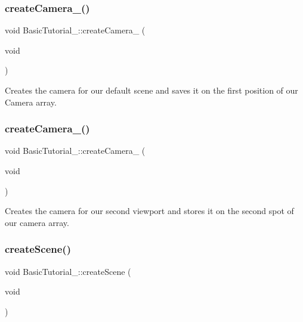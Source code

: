 \subsubsection{\texorpdfstring{create\+Camera\+\_()}{createCamera\_00()}}
{\footnotesize\ttfamily void Basic\+Tutorial\+\_\+::create\+Camera\+\_ (\begin{DoxyParamCaption}\item[{void}]{ }\end{DoxyParamCaption})\hspace{0.3cm}{\ttfamily [protected]}}



Creates the camera for our default scene and saves it on the first position of our Camera array. 



 \mbox{\label{class_basic_tutorial__00_a8745a127adeb69fa769f832fd41412c0}} 
\subsubsection{\texorpdfstring{create\+Camera\+\_()}{createCamera\_01()}}
{\footnotesize\ttfamily void Basic\+Tutorial\+\_\+::create\+Camera\+\_ (\begin{DoxyParamCaption}\item[{void}]{ }\end{DoxyParamCaption})\hspace{0.3cm}{\ttfamily [protected]}}



Creates the camera for our second viewport and stores it on the second spot of our camera array. 



 \mbox{\label{class_basic_tutorial__00_a15a3d4673724ec99077ce992f996a550}} 
\subsubsection{\texorpdfstring{create\+Scene()}{createScene()}}
{\footnotesize\ttfamily void Basic\+Tutorial\+\_\+::create\+Scene (\begin{DoxyParamCaption}\item[{void}]{ }\end{DoxyParamCaption})\hspace{0.3cm}{\ttfamily [virtual]}}



